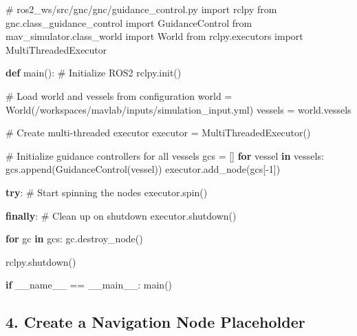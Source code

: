 \documentclass[
  letterpaper,
  DIV=11,
  numbers=noendperiod]{scrreprt}
\newenvironment{Shaded}{\begin{snugshade}}{\end{snugshade}}
\newcommand{\CommentTok}[1]{\textcolor[rgb]{0.37,0.37,0.37}{#1}}
\newcommand{\ControlFlowTok}[1]{\textcolor[rgb]{0.00,0.23,0.31}{\textbf{#1}}}
\newcommand{\DecValTok}[1]{\textcolor[rgb]{0.68,0.00,0.00}{#1}}
\newcommand{\ImportTok}[1]{\textcolor[rgb]{0.00,0.46,0.62}{#1}}
\newcommand{\KeywordTok}[1]{\textcolor[rgb]{0.00,0.23,0.31}{\textbf{#1}}}
\newcommand{\NormalTok}[1]{\textcolor[rgb]{0.00,0.23,0.31}{#1}}
\newcommand{\OperatorTok}[1]{\textcolor[rgb]{0.37,0.37,0.37}{#1}}
\newcommand{\StringTok}[1]{\textcolor[rgb]{0.13,0.47,0.30}{#1}}
\newcommand{\VariableTok}[1]{\textcolor[rgb]{0.07,0.07,0.07}{#1}}
\begin{document}
\begin{Shaded}
\begin{Highlighting}[]
\CommentTok{\# ros2\_ws/src/gnc/gnc/guidance\_control.py}
\ImportTok{import}\NormalTok{ rclpy}
\ImportTok{from}\NormalTok{ gnc.class\_guidance\_control }\ImportTok{import}\NormalTok{ GuidanceControl}
\ImportTok{from}\NormalTok{ mav\_simulator.class\_world }\ImportTok{import}\NormalTok{ World}
\ImportTok{from}\NormalTok{ rclpy.executors }\ImportTok{import}\NormalTok{ MultiThreadedExecutor}

\KeywordTok{def}\NormalTok{ main():}
    \CommentTok{\# Initialize ROS2}
\NormalTok{    rclpy.init()}
    
    \CommentTok{\# Load world and vessels from configuration}
\NormalTok{    world }\OperatorTok{=}\NormalTok{ World(}\StringTok{\textquotesingle{}/workspaces/mavlab/inputs/simulation\_input.yml\textquotesingle{}}\NormalTok{)}
\NormalTok{    vessels }\OperatorTok{=}\NormalTok{ world.vessels}
    
    \CommentTok{\# Create multi{-}threaded executor}
\NormalTok{    executor }\OperatorTok{=}\NormalTok{ MultiThreadedExecutor()}
    
    \CommentTok{\# Initialize guidance controllers for all vessels}
\NormalTok{    gcs }\OperatorTok{=}\NormalTok{ []}
    \ControlFlowTok{for}\NormalTok{ vessel }\KeywordTok{in}\NormalTok{ vessels:}
\NormalTok{        gcs.append(GuidanceControl(vessel))}
\NormalTok{        executor.add\_node(gcs[}\OperatorTok{{-}}\DecValTok{1}\NormalTok{])}
    
    \ControlFlowTok{try}\NormalTok{: }
        \CommentTok{\# Start spinning the nodes}
\NormalTok{        executor.spin()}

    \ControlFlowTok{finally}\NormalTok{:}
        \CommentTok{\# Clean up on shutdown}
\NormalTok{        executor.shutdown()}
        
        \ControlFlowTok{for}\NormalTok{ gc }\KeywordTok{in}\NormalTok{ gcs:}
\NormalTok{            gc.destroy\_node()}
        
\NormalTok{        rclpy.shutdown()}

\ControlFlowTok{if} \VariableTok{\_\_name\_\_} \OperatorTok{==} \StringTok{\textquotesingle{}\_\_main\_\_\textquotesingle{}}\NormalTok{:}
\NormalTok{    main()}
\end{Highlighting}
\end{Shaded}

\subsection*{4. Create a Navigation Node
Placeholder}\label{create-a-navigation-node-placeholder}
\end{document}

